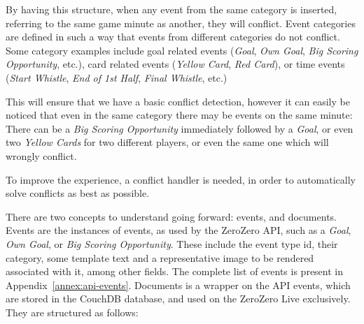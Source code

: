 By having this structure, when any event from the same category is inserted, referring to the same game minute as another, they will conflict. Event categories are defined in such a way that events from different categories do not conflict. Some category examples include goal related events (\textit{Goal}, \textit{Own Goal}, \textit{Big Scoring Opportunity}, etc.), card related events (\textit{Yellow Card}, \textit{Red Card}), or time events (\textit{Start Whistle}, \textit{End of 1st Half}, \textit{Final Whistle}, etc.)

This will ensure that we have a basic conflict detection, however it can easily be noticed that even in the same category there may be events on the same minute: There can be a \textit{Big Scoring Opportunity} immediately followed by a \textit{Goal}, or even two \textit{Yellow Cards} for two different players, or even the same one which will wrongly conflict.

To improve the experience, a conflict handler is needed, in order to automatically solve conflicts as best as possible.

There are two concepts to understand going forward: events, and documents. Events are the instances of events, as used by the ZeroZero API, such as a \textit{Goal}, \textit{Own Goal}, or \textit{Big Scoring Opportunity}. These include the event type id, their category, some template text and a representative image to be rendered associated with it, among other fields. The complete list of events is present in Appendix~\ref{annex:api-events}. Documents is a wrapper on the API events, which are stored in the CouchDB database, and used on the ZeroZero Live exclusively. They are structured as follows:

